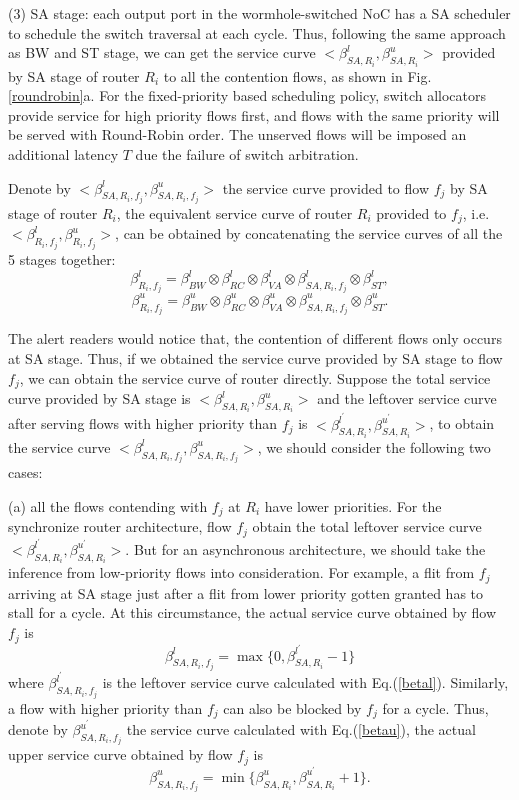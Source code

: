 \documentclass[10pt,journal]{IEEEtran}
\begin{document}
(3) SA stage: each output port in the wormhole-switched NoC has a SA scheduler to schedule the switch traversal at each cycle. Thus, following the same approach as BW and ST stage, we can get the service curve $<\beta_{SA,R_i}^l,\beta_{SA,R_i}^u>$ provided by SA stage of router $R_i$ to all the contention flows, as shown in Fig. \ref{roundrobin}a. For the fixed-priority based scheduling policy, switch allocators provide service for high priority flows first, and flows with the same priority will be served with Round-Robin order. The unserved flows will be imposed an additional latency $T$ due the failure of switch arbitration.

Denote by $<\beta_{SA,R_i,f_j}^l,\beta_{SA,R_i,f_j}^u>$ the service curve provided to flow $f_j$ by SA stage of router $R_i$, the equivalent service curve of router $R_i$ provided to $f_j$, i.e. $<\beta_{R_i,f_j}^l,\beta_{R_i,f_j}^u>$, can be obtained by concatenating the service curves of all the 5 stages together:
$$\beta_{R_i,f_j}^l=\beta_{BW}^l\otimes\beta_{RC}^l\otimes\beta_{VA}^l\otimes\beta_{SA,R_i,f_j}^l\otimes \beta_{ST}^l,$$
$$\beta_{R_i,f_j}^u=\beta_{BW}^u\otimes\beta_{RC}^u\otimes\beta_{VA}^u\otimes\beta_{SA,R_i,f_j}^u\otimes \beta_{ST}^u.$$

The alert readers would notice that, the contention of different flows only occurs at SA stage. Thus, if we obtained the service curve provided by SA stage to flow $f_j$, we can obtain the service curve of router directly. Suppose the total service curve provided by SA stage is $<\beta_{SA,R_i}^l,\beta_{SA,R_i}^u>$ and the leftover service curve after serving flows with higher priority than $f_j$ is $<\beta_{SA,R_i}^{l^\prime},\beta_{SA,R_i}^{u^\prime}>$, to obtain the service curve $<\beta_{SA,R_i,f_j}^l,\beta_{SA,R_i,f_j}^u>$, we should consider the following two cases:

(a) all the flows contending with $f_j$ at $R_i$ have lower priorities. For the synchronize router architecture, flow $f_j$ obtain the total leftover service curve $<\beta_{SA,R_i}^{l^\prime},\beta_{SA,R_i}^{u^\prime}>$. But for an asynchronous architecture, we should take the inference from low-priority flows into consideration. For example, a flit from $f_j$ arriving at SA stage just after a flit from lower priority gotten granted has to stall for a cycle. At this circumstance, the actual service curve obtained by flow $f_j$ is \cite{Haid:2007:CTA:1289816.1289860}
\begin{equation}\label{nonpreemptbetal}
\beta^{l}_{SA,R_i,f_j}=\max\{0,\beta^{l^\prime}_{SA,R_i}-1\}
\end{equation}
where $\beta^{l^\prime}_{SA,R_i,f_j}$ is the leftover service curve calculated with Eq.(\ref{betal}). Similarly, a flow with higher priority than $f_j$ can also be blocked by $f_j$ for a cycle. Thus, denote by $\beta^{u^\prime}_{SA,R_i,f_j}$ the service curve calculated with Eq.(\ref{betau}), the actual upper service curve obtained by flow $f_j$ is \cite{Haid:2007:CTA:1289816.1289860}
\begin{equation}\label{nonpreemptbetau}
\beta^{u}_{SA,R_i,f_j}=\min\{\beta^{u}_{SA,R_i},\beta^{u^\prime}_{SA,R_i}+1\}.
\end{equation}
\end{document}
